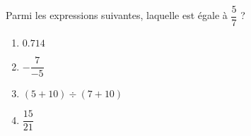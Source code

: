 
\begin{exercice}\label{exosmath-0964}

    Parmi les expressions suivantes, laquelle est égale à \( \dfrac{ 5 }{ 7 }\) ?
    \begin{multicols}{3}
        \begin{enumerate}
            \item
                $0.714$
            \item
                \( -\dfrac{ 7 }{ -5 }\)
            \item
                \( (5+10)\div(7+10)\)
            \item
                \( \dfrac{ 15 }{ 21 }\)
        \end{enumerate}
    \end{multicols}

\end{exercice}

